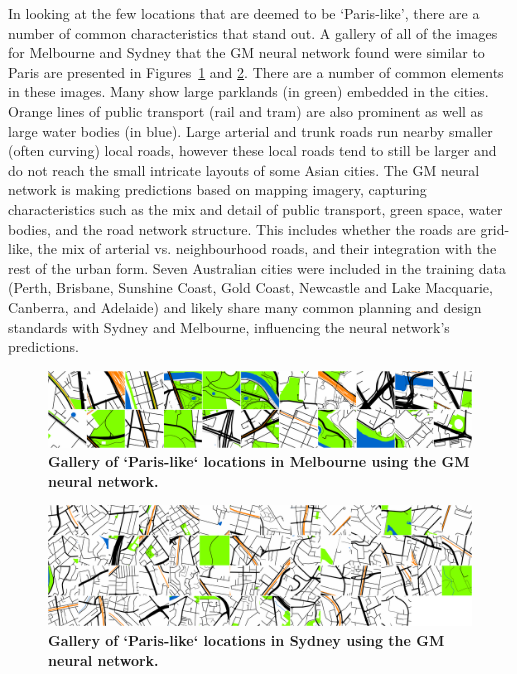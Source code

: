 \documentclass[urbansci,article,submit,moreauthors,pdftex]{Definitions/mdpi}
\begin{document}
In looking at the few locations that are deemed to be `Paris-like', there are a number of common characteristics that stand out. A gallery of all of the images for Melbourne and Sydney that the GM neural network found were similar to Paris are presented in Figures~\ref{fig:gm_mel_gallery} and \ref{fig:gm_syd_gallery}. There are a number of common elements in these images. Many show large parklands (in green) embedded in the cities. Orange lines of public transport (rail and tram) are also prominent as well as large water bodies (in blue). Large arterial and trunk roads run nearby smaller (often curving) local roads, however these local roads tend to still be larger and do not reach the small intricate layouts of some Asian cities. The GM neural network is making predictions based on mapping imagery, capturing characteristics such as the mix and detail of public transport, green space, water bodies, and the road network structure. This includes whether the roads are grid-like, the mix of arterial vs. neighbourhood roads, and their integration with the rest of the urban form. Seven Australian cities were included in the training data (Perth, Brisbane, Sunshine Coast, Gold Coast, Newcastle and Lake Macquarie, Canberra, and Adelaide) and likely share many common planning and design standards with Sydney and Melbourne, influencing the neural network's predictions. 

\begin{figure}[!htbp]
\centering   
\includegraphics[scale=0.10]{Figure7MelMaps.png}   
\caption{\bf Gallery of `Paris-like` locations in Melbourne using the GM neural network.}    
 \label{fig:gm_mel_gallery} 
\end{figure} 


\begin{figure}[!htbp]
\centering   
\includegraphics[scale=0.11]{Figure8SydMaps.png}   
\caption{\bf Gallery of `Paris-like` locations in Sydney using the GM neural network.}    
 \label{fig:gm_syd_gallery}  
\end{figure} 
\end{document}
